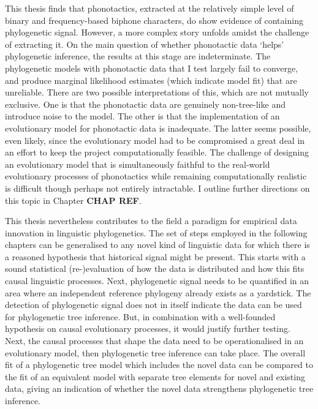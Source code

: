 This thesis finds that phonotactics, extracted at the relatively simple level of binary and frequency-based biphone characters, do show evidence of containing phylogenetic signal. However, a more complex story unfolds amidst the challenge of extracting it. On the main question of whether phonotactic data `helps' phylogenetic inference, the results at this stage are indeterminate. The phylogenetic models with phonotactic data that I test largely fail to converge, and produce marginal likelihood estimates (which indicate model fit) that are unreliable. There are two possible interpretations of this, which are not mutually exclusive. One is that the phonotactic data are genuinely non-tree-like and introduce noise to the model. The other is that the implementation of an evolutionary model for phonotactic data is inadequate. The latter seems possible, even likely, since the evolutionary model had to be compromised a great deal in an effort to keep the project computationally feasible. The challenge of designing an evolutionary model that is simultaneously faithful to the real-world evolutionary processes of phonotactics while remaining computationally realistic is difficult though perhaps not entirely intractable. I outline further directions on this topic in Chapter \textbf{CHAP REF}.

This thesis nevertheless contributes to the field a paradigm for empirical data innovation in linguistic phylogenetics. The set of steps employed in the following chapters can be generalised to any novel kind of linguistic data for which there is a reasoned hypothesis that historical signal might be present. This starts with a sound statistical (re-)evaluation of how the data is distributed and how this fits causal linguistic processes. Next, phylogenetic signal needs to be quantified in an area where an independent reference phylogeny already exists as a yardstick. The detection of phylogenetic signal does not in itself indicate the data can be used for phylogenetic tree inference. But, in combination with a well-founded hypothesis on causal evolutionary processes, it would justify further testing. Next, the causal processes that shape the data need to be operationalised in an evolutionary model, then phylogenetic tree inference can take place. The overall fit of a phylogenetic tree model which includes the novel data can be compared to the fit of an equivalent model with separate tree elements for novel and existing data, giving an indication of whether the novel data strengthens phylogenetic tree inference.

